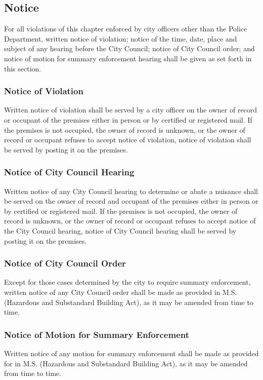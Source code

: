 \subsection{Notice}
For all violations of this chapter enforced by city officers other than the Police Department, written notice of violation; notice of the time, date, place and subject of any hearing before the City Council; notice of City Council order; and notice of motion for summary enforcement hearing shall be given as set forth in this section.
\subsubsection{Notice of Violation}
Written notice of violation shall be served by a city officer on the owner of record or occupant of the premises either in person or by certified or registered mail.  If the premises is not occupied, the owner of record is unknown, or the owner of record or occupant refuses to accept notice of violation, notice of violation shall be served by posting it on the premises.
\subsubsection{Notice of City Council Hearing}
Written notice of any City Council hearing to determine or abate a nuisance shall be served on the owner of record and occupant of the premises either in person or by certified or registered mail.  If the premises is not occupied, the owner of record is unknown, or the owner of record or occupant refuses to accept notice of the City Council hearing, notice of City Council hearing shall be served by posting it on the premises.
\subsubsection{Notice of City Council Order}
Except for those cases determined by the city to require summary enforcement, written notice of any City Council order shall be made as provided in M.S.  (Hazardous and Substandard Building Act), as it may be amended from time to time.
\subsubsection{Notice of Motion for Summary Enforcement}
Written notice of any motion for summary enforcement shall be made as provided for in M.S.  (Hazardous and Substandard Building Act), as it may be amended from time to time.

